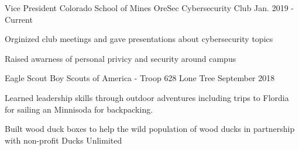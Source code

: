 

\begin{cventries}

  \cventry
    {Vice President} %
    {Colorado School of Mines OreSec Cybersecurity Club} %
    {} %
    {Jan. 2019 - Current} %
    {
      \begin{cvitems} %
        \item {Orginized club meetings and gave presentations about
            cybersecurity topics}
        \item {Raised awarness of personal privicy and security around campus}
      \end{cvitems}
    }

  \cventry
    {Eagle Scout} %
    {Boy Scouts of America - Troop 628} %
    {Lone Tree} %
    {September 2018} %
    {
      \begin{cvitems} %
        \item {Learned leadership skills through outdoor adventures
            including trips to Flordia for sailing an Minnisoda for
            backpacking. }
        \item {Built wood duck boxes to help the wild population of
            wood ducks in partnership with non-profit Ducks Unlimited}
      \end{cvitems}
    }

\end{cventries}
